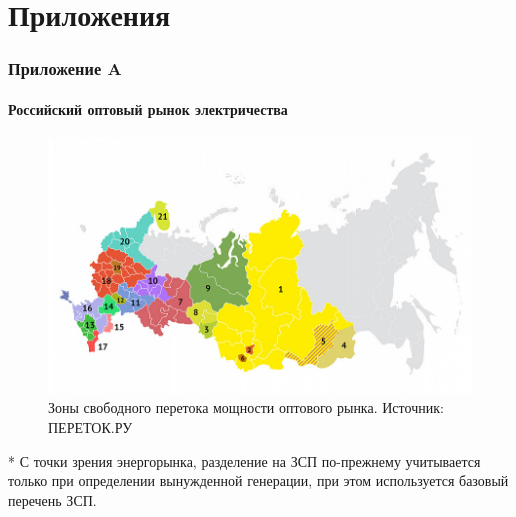 \documentclass[c, dvipsnames]{beamer}  %
\begin{document}
\section{Приложения}

%

\begin{frame}[shrink=5]
\frametitle{Приложение A} 
\framesubtitle{Российский оптовый рынок электричества} 
\begin{figure}
\centering
\includegraphics[width=0.7\linewidth]{screenshot16}
\caption{ Зоны свободного перетока мощности оптового рынка.  Источник: ПЕРЕТОК.РУ }
\label{fig:screenshot015}
\end{figure}
\footnotesize{* С точки зрения энергорынка, разделение на ЗСП по-прежнему учитывается только при определении вынужденной генерации, при этом используется базовый перечень ЗСП.}
\end{frame}
\end{document}
